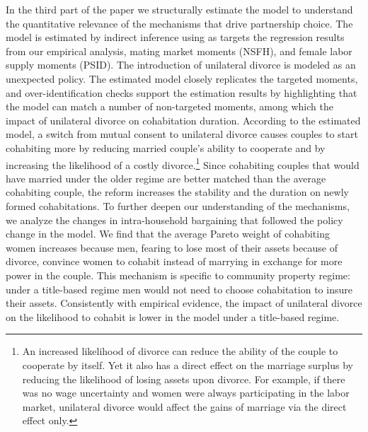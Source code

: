 \documentclass[12pt]{article}
\numberwithin{table}{section}
\begin{document}

In the third part of the paper we structurally estimate the model to understand the quantitative relevance of the mechanisms that drive partnership choice. The model is estimated by indirect inference using as targets the regression results from our empirical analysis, mating market moments (NSFH), and female labor supply moments (PSID). The introduction of unilateral divorce is modeled as an unexpected policy. The estimated model closely replicates the targeted moments, and over-identification checks support the estimation results by highlighting that the model can match a number of non-targeted moments, among which the impact of unilateral divorce on cohabitation duration. According to the estimated model, a switch from mutual consent to unilateral divorce causes couples to start cohabiting more by reducing married couple's ability to cooperate and by increasing the likelihood of a costly divorce.\footnote{An increased likelihood of divorce can reduce the ability of the couple to cooperate by itself. Yet it also has a direct effect on the marriage surplus by reducing the likelihood of losing assets upon divorce. For example, if there was no wage uncertainty and women were always participating in the labor market, unilateral divorce would affect the gains of marriage via the direct effect only.} Since cohabiting couples that would have married under the older regime are better matched than the average cohabiting couple, the reform increases the stability and the duration on newly formed cohabitations. To further deepen our understanding of the mechanisms, we analyze the changes in intra-household bargaining that followed the policy change in the model. We find that the average Pareto weight of cohabiting women increases because men, fearing to lose most of their assets because of divorce, convince women to cohabit instead of marrying in exchange for more power in the couple. This mechanism is specific to community property regime: under a title-based regime men would not need to choose cohabitation to insure their assets. Consistently with empirical evidence, the impact of unilateral divorce on the likelihood to cohabit is lower in the model under a title-based regime.
\end{document}
